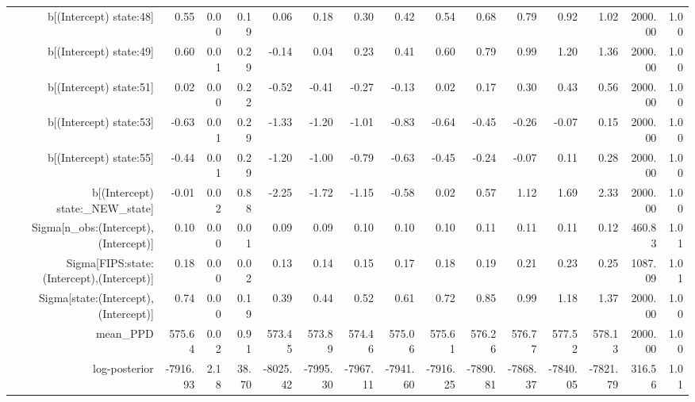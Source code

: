 \begin{table}[ht]
\begin{tabular}{rrrrrrrrrrrrrrr}
  b[(Intercept) state:48] & 0.55 & 0.00 & 0.19 & 0.06 & 0.18 & 0.30 & 0.42 & 0.54 & 0.68 & 0.79 & 0.92 & 1.02 & 2000.00 & 1.00 \\ 
  b[(Intercept) state:49] & 0.60 & 0.01 & 0.29 & -0.14 & 0.04 & 0.23 & 0.41 & 0.60 & 0.79 & 0.99 & 1.20 & 1.36 & 2000.00 & 1.00 \\ 
  b[(Intercept) state:51] & 0.02 & 0.00 & 0.22 & -0.52 & -0.41 & -0.27 & -0.13 & 0.02 & 0.17 & 0.30 & 0.43 & 0.56 & 2000.00 & 1.00 \\ 
  b[(Intercept) state:53] & -0.63 & 0.01 & 0.29 & -1.33 & -1.20 & -1.01 & -0.83 & -0.64 & -0.45 & -0.26 & -0.07 & 0.15 & 2000.00 & 1.00 \\ 
  b[(Intercept) state:55] & -0.44 & 0.01 & 0.29 & -1.20 & -1.00 & -0.79 & -0.63 & -0.45 & -0.24 & -0.07 & 0.11 & 0.28 & 2000.00 & 1.00 \\ 
  b[(Intercept) state:\_NEW\_state] & -0.01 & 0.02 & 0.88 & -2.25 & -1.72 & -1.15 & -0.58 & 0.02 & 0.57 & 1.12 & 1.69 & 2.33 & 2000.00 & 1.00 \\ 
  Sigma[n\_obs:(Intercept),(Intercept)] & 0.10 & 0.00 & 0.01 & 0.09 & 0.09 & 0.10 & 0.10 & 0.10 & 0.11 & 0.11 & 0.11 & 0.12 & 460.83 & 1.01 \\ 
  Sigma[FIPS:state:(Intercept),(Intercept)] & 0.18 & 0.00 & 0.02 & 0.13 & 0.14 & 0.15 & 0.17 & 0.18 & 0.19 & 0.21 & 0.23 & 0.25 & 1087.09 & 1.01 \\ 
  Sigma[state:(Intercept),(Intercept)] & 0.74 & 0.00 & 0.19 & 0.39 & 0.44 & 0.52 & 0.61 & 0.72 & 0.85 & 0.99 & 1.18 & 1.37 & 2000.00 & 1.00 \\ 
  mean\_PPD & 575.64 & 0.02 & 0.91 & 573.45 & 573.89 & 574.46 & 575.06 & 575.61 & 576.26 & 576.77 & 577.52 & 578.13 & 2000.00 & 1.00 \\ 
  log-posterior & -7916.93 & 2.18 & 38.70 & -8025.42 & -7995.30 & -7967.11 & -7941.60 & -7916.25 & -7890.81 & -7868.37 & -7840.05 & -7821.79 & 316.56 & 1.01 \\ 
   \hline
\end{tabular}
\end{table}
